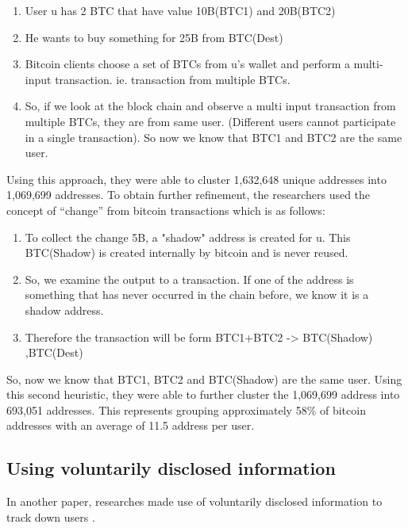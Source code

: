 \begin{enumerate}
\item User u has 2 BTC that have value 10B(BTC1) and 20B(BTC2)
\item He wants to buy something for 25B from BTC(Dest)
\item Bitcoin clients choose a set of BTCs from u’s wallet and perform a multi-input transaction. ie. transaction from multiple BTCs. 
\item So, if we look at the block chain and observe a multi input transaction from multiple BTCs, they are from same user. (Different users cannot participate in a single transaction). So now we know that BTC1 and BTC2 are the same user.
\end{enumerate}

Using this approach, they were able to cluster 1,632,648 unique addresses into 1,069,699 addresses. To obtain further refinement, the researchers used the concept of “change” from bitcoin transactions which is as follows:

\begin{enumerate}
\item To collect the change 5B, a "shadow" address is created for u. This BTC(Shadow) is created internally by bitcoin and is never reused.
\item So, we examine the output to a transaction. If one of the address is something that has never occurred in the chain before, we know it is a shadow address. 
\item Therefore the transaction will be form 
BTC1+BTC2 -> BTC(Shadow) ,BTC(Dest)
\end{enumerate}

So, now we know that BTC1, BTC2 and BTC(Shadow) are the same user. Using this second heuristic, they were able to further cluster the 1,069,699 address into 693,051 addresses. This represents grouping approximately 58\% of bitcoin addresses with an average of 11.5 address per user.

\subsection{Using voluntarily disclosed information}
In another paper, researches made use of voluntarily disclosed information to track down users \cite{volun}.

